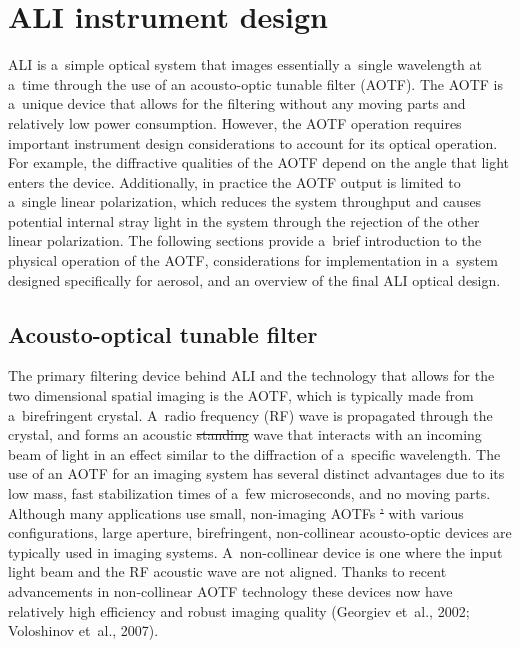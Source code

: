 \documentclass[amtd, online, hvmath]{copernicus}
\providecommand{\DIFadd}[1]{{\protect\color{blue}\uwave{#1}}} %
\providecommand{\DIFdel}[1]{{\protect\color{red}\sout{#1}}}                      %
\providecommand{\DIFaddbegin}{} %
\providecommand{\DIFaddend}{} %
\providecommand{\DIFdelbegin}{} %
\providecommand{\DIFdelend}{} %
\begin{document}
\section{ALI instrument design}

ALI is a~simple optical system that images essentially a~single
wavelength at a~time through the use of an acousto-optic tunable
filter (AOTF). The AOTF is a~unique device that allows for the
filtering without any moving parts and relatively low power
consumption. However, the AOTF operation requires important instrument
design considerations to account for its optical operation. For
example, the diffractive qualities of the AOTF depend on the angle
that light enters the device. Additionally, in practice the AOTF
output is limited to a~single linear polarization, which reduces the
system throughput and causes potential internal stray light in the
system through the rejection of the other linear polarization. The
following sections provide a~brief introduction to the physical
operation of the AOTF, considerations for implementation in a~system
designed specifically for aerosol, and an overview of the final ALI
optical design.

\subsection{Acousto-optical tunable filter}

The primary filtering device behind ALI and the technology that allows
for the two dimensional spatial imaging is the AOTF, which is
typically made from a~birefringent crystal. A~radio frequency (RF)
wave is propagated through the crystal, and forms an acoustic \DIFdelbegin \DIFdel{standing
}\DIFdelend \DIFaddbegin \DIFadd{shear
}\DIFaddend wave that interacts with an incoming beam of light in an effect
similar to the diffraction of a~specific wavelength. The use of an
AOTF for an imaging system has several distinct advantages due to its
low mass, fast stabilization times of a~few microseconds, and no
moving parts. Although many applications use small, non-imaging AOTFs
\DIFdelbegin \DIFdel{'
}\DIFdelend with various configurations, large aperture, birefringent,
non-collinear acousto-optic devices are typically used in imaging
systems. A~non-collinear device is one where the input light beam and
the RF acoustic wave are not aligned. Thanks to recent advancements in
non-collinear AOTF technology these devices now have relatively high
efficiency and robust imaging quality (Georgiev et~al., 2002;
Voloshinov et~al., 2007).
\end{document}
